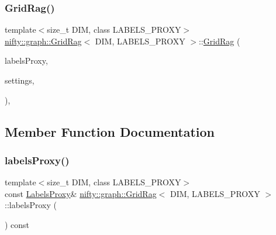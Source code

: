 \mbox{\label{classnifty_1_1graph_1_1GridRag_a559717d346c6e2e626994c1018fc5761}} 
\subsubsection{\texorpdfstring{Grid\+Rag()}{GridRag()}\hspace{0.1cm}{\footnotesize\ttfamily [3/3]}}
{\footnotesize\ttfamily template$<$size\+\_\+t D\+IM, class L\+A\+B\+E\+L\+S\+\_\+\+P\+R\+O\+XY$>$ \\
\hyperlink{classnifty_1_1graph_1_1GridRag}{nifty\+::graph\+::\+Grid\+Rag}$<$ D\+IM, L\+A\+B\+E\+L\+S\+\_\+\+P\+R\+O\+XY $>$\+::\hyperlink{classnifty_1_1graph_1_1GridRag}{Grid\+Rag} (\begin{DoxyParamCaption}\item[{const \hyperlink{classnifty_1_1graph_1_1GridRag_ad3146f72301da4f45b51e3b692776cf1}{Labels\+Proxy} \&}]{labels\+Proxy,  }\item[{const \hyperlink{structnifty_1_1graph_1_1GridRag_1_1SettingsType}{Settings\+Type} \&}]{settings,  }\item[{const \hyperlink{structnifty_1_1graph_1_1GridRag_1_1DontComputeRag}{Dont\+Compute\+Rag}}]{ }\end{DoxyParamCaption})\hspace{0.3cm}{\ttfamily [inline]}, {\ttfamily [protected]}}



\subsection{Member Function Documentation}
\mbox{\label{classnifty_1_1graph_1_1GridRag_a8589e44e41c12e7956d7d25a644c238e}} 
\subsubsection{\texorpdfstring{labels\+Proxy()}{labelsProxy()}}
{\footnotesize\ttfamily template$<$size\+\_\+t D\+IM, class L\+A\+B\+E\+L\+S\+\_\+\+P\+R\+O\+XY$>$ \\
const \hyperlink{classnifty_1_1graph_1_1GridRag_ad3146f72301da4f45b51e3b692776cf1}{Labels\+Proxy}\& \hyperlink{classnifty_1_1graph_1_1GridRag}{nifty\+::graph\+::\+Grid\+Rag}$<$ D\+IM, L\+A\+B\+E\+L\+S\+\_\+\+P\+R\+O\+XY $>$\+::labels\+Proxy (\begin{DoxyParamCaption}{ }\end{DoxyParamCaption}) const\hspace{0.3cm}{\ttfamily [inline]}}

